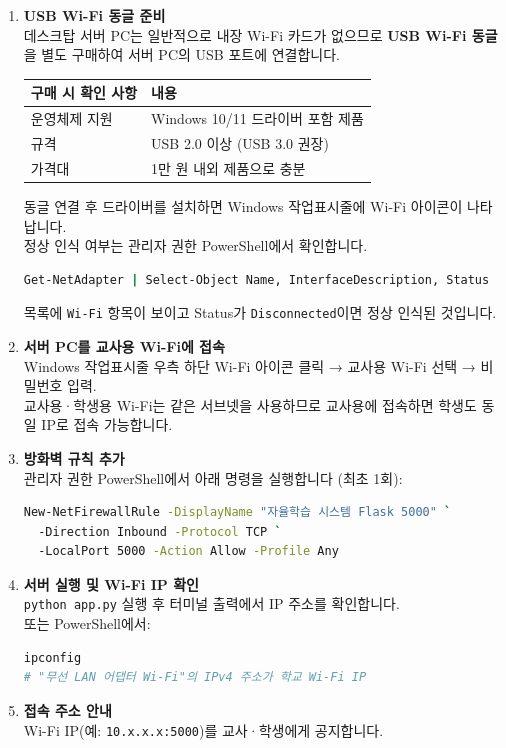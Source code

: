 \documentclass[a4paper,12pt]{article}
\begin{document}
\begin{enumerate}[leftmargin=1.5em]
  \item \textbf{USB Wi-Fi 동글 준비}\\
    데스크탑 서버 PC는 일반적으로 내장 Wi-Fi 카드가 없으므로
    \textbf{USB Wi-Fi 동글}을 별도 구매하여 서버 PC의 USB 포트에 연결합니다.

    \begin{center}
    \begin{tabular}{ll}
    \toprule
    \textbf{구매 시 확인 사항} & \textbf{내용} \\
    \midrule
    운영체제 지원 & Windows 10/11 드라이버 포함 제품 \\
    규격 & USB 2.0 이상 (USB 3.0 권장) \\
    가격대 & 1만 원 내외 제품으로 충분 \\
    \bottomrule
    \end{tabular}
    \end{center}

    동글 연결 후 드라이버를 설치하면 Windows 작업표시줄에 Wi-Fi 아이콘이 나타납니다.\\
    정상 인식 여부는 관리자 권한 PowerShell에서 확인합니다.
\begin{lstlisting}[language=bash]
Get-NetAdapter | Select-Object Name, InterfaceDescription, Status
\end{lstlisting}
    목록에 \texttt{Wi-Fi} 항목이 보이고 Status가 \texttt{Disconnected}이면 정상 인식된 것입니다.

  \item \textbf{서버 PC를 교사용 Wi-Fi에 접속}\\
    Windows 작업표시줄 우측 하단 Wi-Fi 아이콘 클릭 → 교사용 Wi-Fi 선택 → 비밀번호 입력.\\
    교사용·학생용 Wi-Fi는 같은 서브넷을 사용하므로 교사용에 접속하면 학생도 동일 IP로 접속 가능합니다.

  \item \textbf{방화벽 규칙 추가}\\
    관리자 권한 PowerShell에서 아래 명령을 실행합니다 (최초 1회):
\begin{lstlisting}[language=bash]
New-NetFirewallRule -DisplayName "자율학습 시스템 Flask 5000" `
  -Direction Inbound -Protocol TCP `
  -LocalPort 5000 -Action Allow -Profile Any
\end{lstlisting}

  \item \textbf{서버 실행 및 Wi-Fi IP 확인}\\
    \texttt{python app.py} 실행 후 터미널 출력에서 IP 주소를 확인합니다.\\
    또는 PowerShell에서:
\begin{lstlisting}[language=bash]
ipconfig
# "무선 LAN 어댑터 Wi-Fi"의 IPv4 주소가 학교 Wi-Fi IP
\end{lstlisting}

  \item \textbf{접속 주소 안내}\\
    Wi-Fi IP(예: \texttt{10.x.x.x:5000})를 교사·학생에게 공지합니다.
\end{enumerate}
\end{document}
